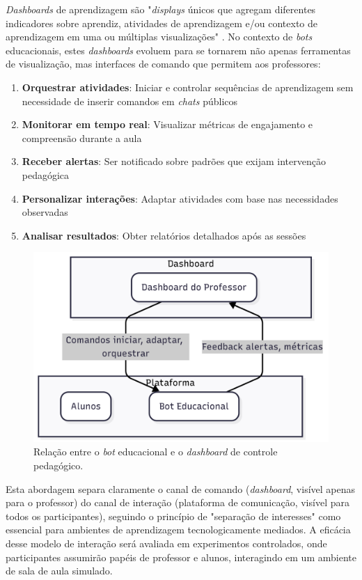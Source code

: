 \textit{Dashboards} de aprendizagem são "\textit{displays} únicos que agregam
diferentes indicadores sobre aprendiz, atividades de aprendizagem e/ou contexto
de aprendizagem em uma ou múltiplas visualizações" \cite{verbert2013}. No
contexto de \textit{bots} educacionais, estes \textit{dashboards} evoluem para
se tornarem não apenas ferramentas de visualização, mas interfaces de comando
que permitem aos professores:

\begin{enumerate}
\item \textbf{Orquestrar atividades}: Iniciar e controlar sequências de
aprendizagem sem necessidade de inserir comandos em \textit{chats} públicos
\item \textbf{Monitorar em tempo real}: Visualizar métricas de engajamento e
compreensão durante a aula
\item \textbf{Receber alertas}: Ser notificado sobre padrões que exijam
intervenção pedagógica
\item \textbf{Personalizar interações}: Adaptar atividades com base nas
necessidades observadas
\item \textbf{Analisar resultados}: Obter relatórios detalhados após as sessões
\end{enumerate}

\begin{figure}[H] \centering
\includegraphics[width=12cm]{relacao-dashboard-bot.png}
\caption{Relação entre o \textit{bot} educacional e o \textit{dashboard} de
controle pedagógico.}
\label{fig:dashboard-bot}
\end{figure}

Esta abordagem separa claramente o canal de comando (\textit{dashboard}, visível
apenas para o professor) do canal de interação (plataforma de comunicação,
visível para todos os participantes), seguindo o princípio de "separação de
interesses" como essencial para ambientes de aprendizagem tecnologicamente
mediados. A eficácia desse modelo de interação será avaliada em experimentos
controlados, onde participantes assumirão papéis de professor e alunos,
interagindo em um ambiente de sala de aula simulado.

